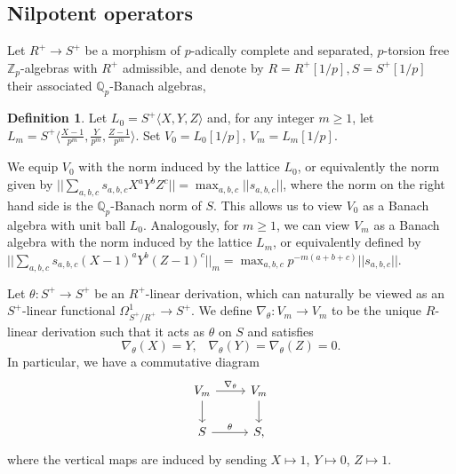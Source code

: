 \documentclass[10pt, oneside]{amsart}
\numberwithin{equation}{subsection}
\theoremstyle{definition}
\newtheorem{definition}[equation]{Definition}
\theoremstyle{remark}
\def\Q{\mathbb{Q}}
\def\Z{{\mathbb{Z}}}
\def\zp{{\Z_p}}
\def\qp{{\Q_p}}
\begin{document}
\subsection{Nilpotent operators} \label{SectNilpOp}

Let $R^+ \to S^+$ be a morphism of $p$-adically complete and separated, $p$-torsion free $\zp$-algebras with $R^+$ admissible, and denote by $R = R^+[1/p], S = S^+[1/p]$ their associated $\qp$-Banach algebras,

\begin{definition}
Let $L_0 = S^+\langle X, Y , Z \rangle$ and, for any integer $m \geq 1$, let $L_m = S^+ \langle \frac{X - 1}{p^m}, \frac{Y}{p^m} , \frac{Z-1}{p^m}\rangle$. Set $V_0 = L_0[1/p]$, $V_m = L_m[1/p]$.
\end{definition}

We equip $V_0$ with the norm induced by the lattice $L_0$, or equivalently the norm given by $|\!| \sum_{a,b, c} s_{a, b, c} X^a Y^b Z^c |\!| =  \max_{a,b, c} |\!|s_{a,b, c}|\!|$, where the norm on the right hand side is the $\qp$-Banach norm of $S$. This allows us to view $V_0$ as a Banach algebra with unit ball $L_0$. Analogously, for $m \geq 1$, we can view $V_m$ as a Banach algebra with the norm induced by the lattice $L_m$, or equivalently defined by $|\!| \sum_{a,b, c} s_{a, b, c} (X-1)^a Y^b (Z-1)^c |\!|_m =  \max_{a,b,c} p^{-m(a + b + c)} |\!|s_{a,b, c}|\!|$.

Let $\theta: S^+ \to S^+$ be an $R^+$-linear derivation, which can naturally be viewed as an $S^+$-linear functional $\Omega^1_{S^+ / R^+} \to S^+$. We define $\nabla_\theta: V_m \to V_m$ to be the unique $R$-linear derivation such that it acts as $\theta$ on $S$ and satisfies
\[ \nabla_\theta(X) = Y, \;\;\; \nabla_\theta(Y) = \nabla_\theta(Z) = 0. \] In particular, we have a commutative diagram
\[
\begin{tikzcd}
V_m \arrow[r, "{\nabla_\theta}"] \arrow[d]             & V_m \arrow[d]            \\
S \arrow[r, "{\theta}"] & S,
\end{tikzcd}
\]
where the vertical maps are induced by sending $X \mapsto 1$, $Y \mapsto 0$, $Z \mapsto 1$.
\end{document}
